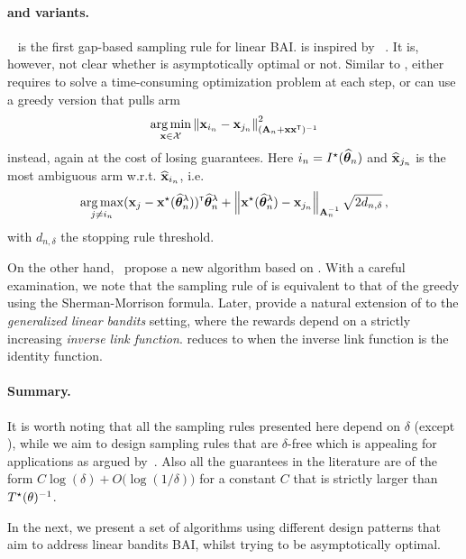 \paragraph{\LGapE and variants.} \LGapE~\citep{xu2018linear} is the first gap-based sampling rule for linear BAI. \LGapE is inspired by \UGapE~\citep{gabillon2012ugape}. It is, however, not clear whether \LGapE is asymptotically optimal or not. Similar to \XYS, \LGapE either requires to solve a time-consuming optimization problem at each step, or can use a greedy version that pulls arm 
\[
    \operatorname*{arg\,min}_{{\bf x}\in\mathcal{X}} \left\lVert{\bf x}_{i_n}-{\bf x}_{j_n}\right\rVert_{({\bf A}_n+{\bf x}{\bf x}^\mathsf{\scriptscriptstyle T})^{-1}}^2
\]
instead, again at the cost of losing guarantees. Here $i_n = I^\star(\widehat{{\boldsymbol \theta}}_n)$ and $\widehat{{\bf x}}_{j_n}$ is the most ambiguous arm w.r.t. $\widehat{{\bf x}}_{i_n}$, i.e. 
\[
    \operatorname*{arg\,max}_{j\neq i_n} ({\bf x}_{j}-{\bf x}^\star(\widehat{{\boldsymbol \theta}}_n^\lambda))^\mathsf{\scriptscriptstyle T}\widehat{{\boldsymbol \theta}}_n^\lambda + \left\lVert{\bf x}^\star(\widehat{{\boldsymbol \theta}}_n^\lambda) - {\bf x}_{j_n}\right\rVert_{{\bf A}_n^{-1}} \sqrt{2d_{n,\delta}}\,,
\]
with $d_{n,\delta}$ the stopping rule threshold.

On the other hand,~\citet{zaki2019maxoverlap} propose a new algorithm based on \LUCB. With a careful examination, we note that the sampling rule of \GLUCB is equivalent to that of the greedy \LGapE using the Sherman-Morrison formula. Later, \citet{kazerouni2019glb} provide a natural extension of \LGapE to the \emph{generalized linear bandits} setting, where the rewards depend on a strictly increasing \emph{inverse link function}. \GLGapE reduces to \LGapE when the inverse link function is the identity function.

\paragraph{Summary.}
It is worth noting that all the sampling rules presented here depend on $\delta$ (except \XYS), while we aim to design sampling rules that are $\delta$-free which is appealing for applications as argued by~\citet{jun2016atlucb}. Also all the guarantees in the literature are of the form $C\log(\delta) + O\big(\log(1/\delta)\big)$ for a constant $C$ that is strictly larger than $T^{\star}(\theta)^{-1}$.

In the next, we present a set of algorithms using different design patterns that aim to address linear bandits BAI, whilst trying to be asymptotically optimal.
